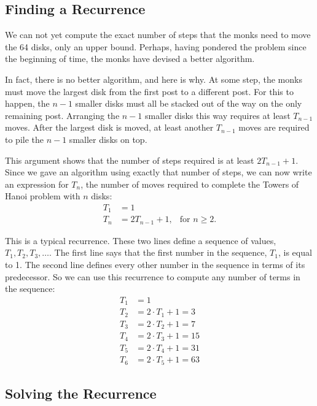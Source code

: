 \subsection{Finding a Recurrence}

We can not yet compute the exact number of steps that the monks need
to move the 64 disks, only an upper bound. Perhaps, having pondered
the problem since the beginning of time, the monks have devised a
better algorithm.

In fact, there is no better algorithm, and here is why. At some step,
the monks must move the largest disk from the first post to a
different post. For this to happen, the $n - 1$ smaller disks must all
be stacked out of the way on the only remaining post. Arranging the $n
- 1$ smaller disks this way requires at least $T_{n-1}$ moves. After
the largest disk is moved, at least another $T_{n-1}$ moves are
required to pile the $n - 1$ smaller disks on top.

This argument shows that the number of steps required is at least
$2T_{n-1} + 1$.  Since we gave an algorithm using exactly that number
of steps, we can now write an expression for $T_n$, the number of
moves required to complete the Towers of Hanoi problem with $n$ disks:
\begin{align*}
T_1 & = 1 \\
T_n & = 2T_{n-1} + 1, & \text{for $n \geq 2$}.
\end{align*}

This is a typical recurrence.  These two lines define a sequence of
values, $T_1, T_2, T_3, \ldots$.  The first line says that the first
number in the sequence, $T_1$, is equal to 1.  The second line defines
every other number in the sequence in terms of its predecessor.  So we
can use this recurrence to compute any number of terms in the sequence:
\begin{align*}
T_1 & = 1 \\
T_2 & = 2 \cdot T_1 + 1 = 3 \\
T_3 & = 2 \cdot T_2 + 1 = 7 \\
T_4 & = 2 \cdot T_3 + 1 = 15 \\
T_5 & = 2 \cdot T_4 + 1 = 31 \\
T_6 & = 2 \cdot T_5 + 1 = 63
\end{align*}

\subsection{Solving the Recurrence}

